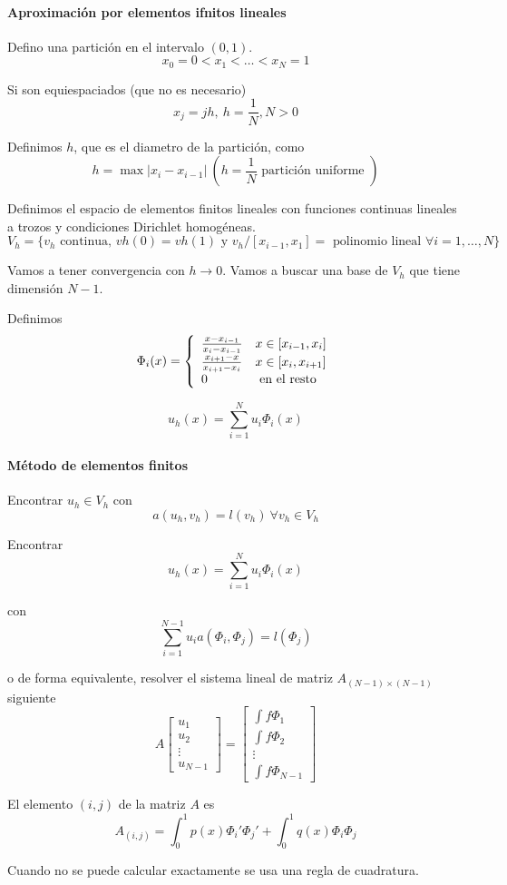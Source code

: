 	\paragraph{Aproximación por elementos ifnitos lineales}
	
	Defino una partición en el intervalo $(0,1)$.
	$$x_0 = 0< x_1 <\hdots < x_N = 1$$
	
	Si son equiespaciados (que no es necesario)
	$$x_j = jh,\ h=\frac{1}{N}, N>0$$
	
	Definimos $h$, que es el diametro de la partición, como
	$$h=\max |x_i-x_{i-1}|\ (h=\frac{1}{N}\text{ partición uniforme })$$
	
	Definimos el espacio de elementos finitos lineales con funciones continuas lineales a trozos y condiciones Dirichlet homogéneas.
	$$V_h  = \{v_h\text{ continua, } vh(0)=vh(1)\text{ y } v_h/\left[x_{i-1}, x_1\right] = \text{ polinomio lineal } \forall i=1,\hdots, N\}$$
	
	Vamos a tener convergencia con $h\to 0$.
	Vamos a buscar una base de $V_h$ que tiene dimensión $N-1$.
	
	Definimos
	\begin{equation*}
		\Phi_i(x) = \left\{
		\begin{array}{l l l}
			\frac{x-x_{i-1}}{x_i-x_{i-1}}& x\in\left[x_{i-1}, x_i\right]\\
			\frac{x_{i+1}-x}{x_{i+1}-x_{i}}& x\in\left[x_{i}, x_{i+1}\right]\\
			0 & \text{ en el resto}\\
		\end{array}
		\right.
	\end{equation*}
	
	$$u_h(x) = \sum_{i=1}^N u_i\Phi_i(x)$$
	
	\paragraph{Método de elementos finitos}
	Encontrar $u_h\in V_h$ con 
	$$a(u_h, v_h) = l(v_h)\ \forall v_h\in V_h$$
	
	Encontrar
	$$u_h(x) = \sum_{i=1}^{N} u_i\Phi _i(x)$$
	
	con 
	$$\sum_{i=1}^{N-1} u_i a(\Phi_i, \Phi_j) = l(\Phi_j)$$
	
	o de forma equivalente, resolver el sistema lineal de matriz $A_{(N-1)\times(N-1)}$ siguiente
	\begin{equation*}
		A
		\begin{bmatrix}
			u_1\\u_2\\\vdots\\u_{N-1}
		\end{bmatrix}
		=
		\begin{bmatrix}
			\int f\Phi_1\\
			\int f\Phi_2\\
			\vdots\\
			\int f\Phi_{N-1}
		\end{bmatrix}
	\end{equation*}
	
	El elemento $(i,j)$ de la matriz $A$ es
	$$A_{(i,j)} = \int_0^1 p(x) \Phi_i'\Phi_j' + \int_0^1 q(x)\Phi_i\Phi_j$$
	
	Cuando no se puede calcular exactamente se usa una regla de cuadratura.
	
	